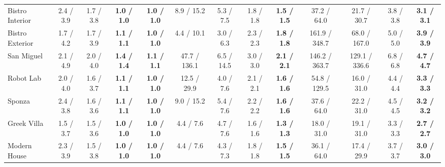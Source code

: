 \begin{table*}[t]
\begin{tabular}{l cccc|cccc|cccc}
	Bistro Interior               & 2.4 / 3.9            & 1.7 / 3.8            & \textbf{1.0 / 1.0}          & \textbf{1.0 / 1.0}          & 8.9 / 15.2           & 5.3 / 7.5            & 1.8 / 1.8            & \textbf{1.5 / 1.5}          & 37.2 / 64.0           & 21.7 / 30.7          & 3.8 / 3.8            & \textbf{3.1 / 3.1}          \\
	Bistro Exterior               & 1.7 / 4.2            & 1.7 / 3.9            & \textbf{1.1 / 1.1}          & \textbf{1.0 / 1.0}          & 4.4 / 10.1           & 3.0 / 6.3            & 2.3 / 2.3            & \textbf{1.8 / 1.8}          & 161.9 / 348.7         & 68.0 / 167.0         & 5.0 / 5.0            & \textbf{3.9 / 3.9}          \\
	San Miguel                    & 2.1 / 4.9            & 2.0 / 4.0            & \textbf{1.4 / 1.4}          & \textbf{1.1 / 1.1}          & 47.7 / 136.1         & 6.5 / 14.5           & 3.0 / 3.0            & \textbf{2.1 / 2.1}          & 146.2 / 363.7         & 129.1 / 336.6        & 6.8 / 6.8            & \textbf{4.7 / 4.7}          \\
	Robot Lab                     & 2.0 / 4.0            & 1.6 / 3.7            & \textbf{1.1 / 1.1}          & \textbf{1.0 / 1.0}          & 12.5 / 29.9          & 4.0 / 7.6            & 2.1 / 2.1            & \textbf{1.6 / 1.6}          & 54.8 / 129.5          & 16.0 / 31.0          & 4.4 / 4.4            & \textbf{3.3 / 3.3}          \\
	Sponza                        & 2.4 / 3.8            & 1.6 / 3.6            & \textbf{1.1 / 1.1}          & \textbf{1.0 / 1.0}          & 9.0 / 15.2           & 5.4 / 7.6            & 2.2 / 2.2            & \textbf{1.6 / 1.6}          & 37.6 / 64.0           & 22.2 / 31.0          & 4.5 / 4.5            & \textbf{3.2 / 3.2}          \\
	Greek Villa                   & 1.5 / 3.7            & 1.5 / 3.6            & \textbf{1.0 / 1.0}          & \textbf{1.0 / 1.0}          & 4.4 / 7.6            & 4.7 / 7.6            & 1.6 / 1.6            & \textbf{1.3 / 1.3}          & 18.0 / 31.0           & 19.1 / 31.0          & 3.3 / 3.3            & \textbf{2.7 / 2.7}          \\
	Modern House                  & 2.3 / 3.9            & 1.5 / 3.8            & \textbf{1.0 / 1.0}          & \textbf{1.0 / 1.0}          & 4.4 / 7.6            & 4.3 / 7.3            & 1.8 / 1.8            & \textbf{1.5 / 1.5}          & 36.1 / 64.0           & 17.4 / 29.9          & 3.7 / 3.7            & \textbf{3.0 / 3.0}          \\

\end{tabular}
\end{table*}
